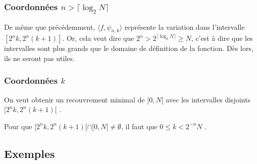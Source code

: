 \documentclass[]{article}
\theoremstyle{remark}
\theoremstyle{definition}
\begin{document}
\subsubsection{Coordonnées $n > \lceil\log_2 N\rceil$}

De même que précédemment, $\langle f,\psi_{n,k}\rangle$ représente la variation dans l'intervalle $[2^{n}k,2^{n}(k+1)]$. Or, cela veut dire que $2^n > 2^{\lceil\log_2 N\rceil}  \geqslant N$,  c'est à dire que les intervalles sont plus grands que le domaine de définition de la fonction. Dès lors, ils ne seront pas utiles.  



\subsubsection{Coordonnées $k$}

On veut obtenir un recouvrement minimal de $[0,N[$ avec les intervalles disjoints $[2^{n}k,2^{n}(k+1)[$ .

Pour que $[2^{n}k,2^{n}(k+1)[\cap[0,N[\neq\emptyset$, il faut que $0\le k< 2^{-n}N$ .







\subsection{Exemples}
\end{document}
